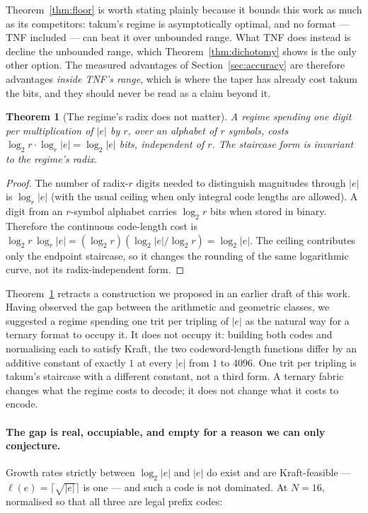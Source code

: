\documentclass[11pt]{article}
\newtheorem{theorem}{Theorem}
\theoremstyle{definition}
\begin{document}
Theorem~\ref{thm:floor} is worth stating plainly because it bounds this work as
much as its competitors: takum's regime is asymptotically optimal, and no format
--- TNF included --- can beat it over unbounded range. What TNF does instead is
decline the unbounded range, which Theorem~\ref{thm:dichotomy} shows is the only
other option. The measured advantages of Section~\ref{sec:accuracy} are therefore
advantages \emph{inside TNF's range}, which is where the taper has already cost
takum the bits, and they should never be read as a claim beyond it.

\begin{theorem}[The regime's radix does not matter]
\label{thm:radixinv}
A regime spending one digit per multiplication of $|e|$ by $r$, over an alphabet
of $r$ symbols, costs $\log_2 r \cdot \log_r |e| = \log_2 |e|$ bits, independent
of $r$. The staircase form is invariant to the regime's radix.
\end{theorem}
\begin{proof}
The number of radix-$r$ digits needed to distinguish magnitudes through $|e|$
is $\log_r|e|$ (with the usual ceiling when only integral code lengths are
allowed).  A digit from an $r$-symbol alphabet carries $\log_2r$ bits when
stored in binary.  Therefore the continuous code-length cost is
$\log_2r\,\log_r|e|=(\log_2r)(\log_2|e|/\log_2r)=\log_2|e|$.
The ceiling contributes only the endpoint staircase, so it changes the
rounding of the same logarithmic curve, not its radix-independent form.
\end{proof}

Theorem~\ref{thm:radixinv} retracts a construction we proposed in an earlier draft
of this work. Having observed the gap between the arithmetic and geometric
classes, we suggested a regime spending one trit per tripling of $|e|$ as the
natural way for a ternary format to occupy it. It does not occupy it: building
both codes and normalising each to satisfy Kraft, the two codeword-length
functions differ by an additive constant of exactly $1$ at every $|e|$ from $1$ to
$4096$. One trit per tripling is takum's staircase with a different constant, not
a third form. A ternary fabric changes what the regime costs to decode; it does
not change what it costs to encode.

\paragraph{The gap is real, occupiable, and empty for a reason we can only
conjecture.} Growth rates strictly between $\log_2|e|$ and $|e|$ do exist and are
Kraft-feasible --- $\ell(e) = \lceil\sqrt{|e|}\rceil$ is one --- and such a code
is not dominated. At $N = 16$, normalised so that all three are legal prefix
codes:
\end{document}
